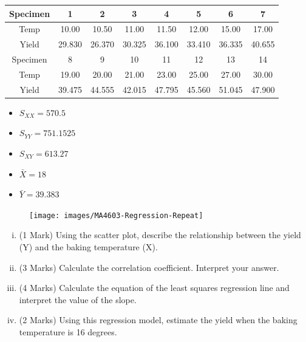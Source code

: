 \documentclass[a4paper,12pt]{article}
\begin{document}
\begin{enumerate}
\begin{center}
	\begin{tabular}{|c||c|c|c|c|c|c|c|}
		\hline
		Specimen & 1 & 2 & 3 & 4 & 5 & 6 & 7 \\ \hline
		\hline
		Temp &  10.00 & 10.50 & 11.00 & 11.50 & 12.00 & 15.00 & 17.00 \\ \hline 
		Yield &  29.830&  26.370 & 30.325 &36.100 &33.410 &36.335 & 40.655 \\ \hline 
		\hline\hline
		Specimen & 8 & 9 & 10 & 11 & 12 & 13 & 14 \\  \hline
		Temp &  19.00 & 20.00 & 21.00 & 23.00 & 25.00 & 27.00 & 30.00 \\ \hline
		Yield &  39.475& 44.555&  42.015 & 47.795 & 45.560&  51.045 & 47.900 \\ \hline 
		\hline
	\end{tabular}
\end{center}

\begin{multicols}{3}
	\begin{itemize}
		\item $S_{XX} = 570.5$
		\item $S_{YY} =  751.1525$
		\item $S_{XY} = 613.27$
		\item $\bar{X} = 18$
		\item $\bar{Y} = 39.383$
	\end{itemize}
\end{multicols}
\medskip

\begin{figure}
\centering
\texttt{[image: images/MA4603-Regression-Repeat]}
\caption{}
\label{fig:ma4603-regression-repeat}
\end{figure}
\medskip
\begin{enumerate}[(i)]
	
	\item (1 Mark) Using the scatter plot, describe the relationship between the yield (Y) and the baking temperature (X).
	
	
	
	
	
	\item (3 Marks) Calculate the correlation coefficient. Interpret your answer.
	\item (4 Marks) Calculate the equation of the least squares regression line and interpret the value of the slope.
	\item (2 Marks) Using this regression model, estimate the yield when the baking temperature is 16 degrees.
\end{enumerate}
\smallskip



\end{enumerate}
\end{document}
